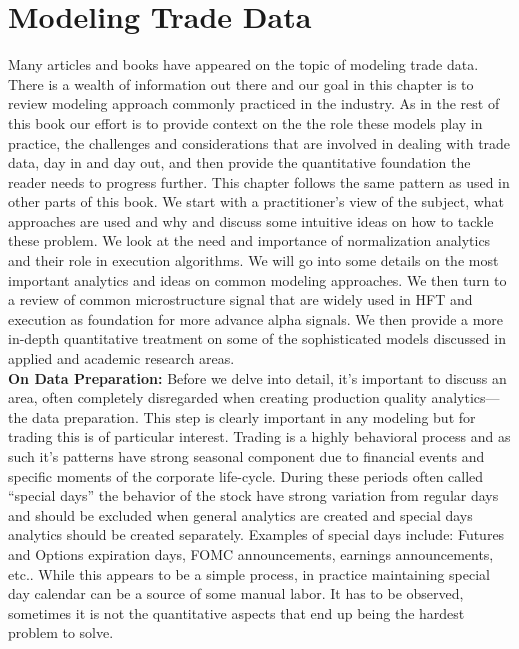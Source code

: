 \chapter{Modeling Trade Data \label{chap:ch_trade_data_models}}

Many articles and books have appeared on the topic of modeling trade data. There is a wealth of information out there and our goal in this chapter is to review modeling approach commonly practiced in the industry. As in the rest of this book our effort is to provide context on the the role these models play in practice, the challenges and considerations that are involved in dealing with trade data, day in and day out, and then provide the quantitative foundation the reader needs to progress further. This chapter follows the same pattern as used in other parts of this book. We start with a practitioner's view of the subject, what approaches are used  and why and discuss some intuitive ideas on how to tackle these problem. We look at the need and importance of normalization analytics and their role in execution algorithms. We will go into some details on the most important analytics and ideas on common modeling approaches. We then turn to a review of common microstructure signal that are widely used in HFT and execution as foundation for more advance alpha signals. We then provide a more in-depth quantitative treatment on some of the sophisticated models discussed in applied and academic research areas. \\


\noindent\textbf{On Data Preparation:} Before we delve into detail, it's important to discuss an area, often completely disregarded when creating production quality analytics---the data preparation. This step is clearly important in any modeling but for trading this is of particular interest. Trading is a highly behavioral process and as such it's patterns have strong seasonal component due to financial events and specific moments of the corporate life-cycle. During these periods often called ``special days'' the behavior of the stock have strong variation from regular days and should be excluded when general analytics are created and special days analytics should be created separately. Examples of special days include: Futures and Options expiration days, FOMC announcements, earnings announcements, etc.. While this appears to be a simple process, in practice maintaining special day calendar can be a source of some manual labor. It has to be observed, sometimes it is not the quantitative aspects that end up being the hardest problem to solve.



